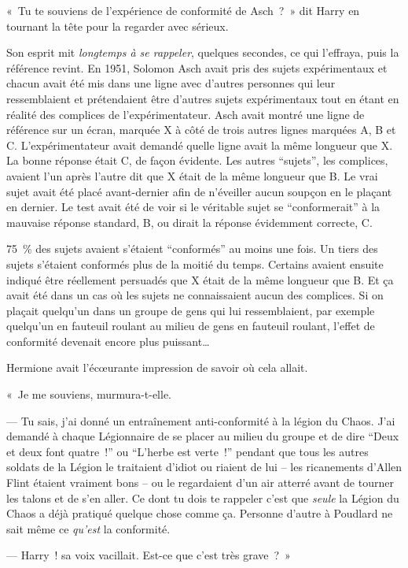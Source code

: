 «~Tu te souviens de l'expérience de conformité de Asch~?~»
dit Harry en tournant la tête pour la regarder avec sérieux.

Son esprit mit \emph{longtemps à se rappeler}, quelques secondes, ce qui l'effraya, puis la référence revint.
En 1951, Solomon Asch avait pris des sujets expérimentaux et chacun avait été mis dans une ligne avec d'autres personnes qui leur ressemblaient et prétendaient être d'autres sujets expérimentaux tout en étant en réalité des complices de l'expérimentateur.
Asch avait montré une ligne de référence sur un écran, marquée X à côté de trois autres lignes marquées A, B et C.
L'expérimentateur avait demandé quelle ligne avait la même longueur que X.
La bonne réponse était C, de façon évidente.
Les autres “sujets”, les complices, avaient l'un après l'autre dit que X était de la même longueur que B.
Le vrai sujet avait été placé avant-dernier afin de n'éveiller aucun soupçon en le plaçant en dernier.
Le test avait été de voir si le véritable sujet se “conformerait” à la mauvaise réponse standard, B, ou dirait la réponse évidemment correcte, C.

75~\% des sujets avaient s'étaient “conformés” au moins une fois.
Un tiers des sujets s'étaient conformés plus de la moitié du temps.
Certains avaient ensuite indiqué être réellement persuadés que X était de la même longueur que B.
Et ça avait été dans un cas où les sujets ne connaissaient aucun des complices.
Si on plaçait quelqu'un dans un groupe de gens qui lui ressemblaient, par exemple quelqu'un en fauteuil roulant au milieu de gens en fauteuil roulant, l'effet de conformité devenait encore plus puissant…

Hermione avait l'écœurante impression de savoir où cela allait.

«~Je me souviens, murmura-t-elle.

--- Tu sais, j'ai donné un entraînement anti-conformité à la légion du Chaos.
J'ai demandé à chaque Légionnaire de se placer au milieu du groupe et de dire “Deux et deux font quatre~!” ou “L'herbe est verte~!” pendant que tous les autres soldats de la Légion le traitaient d'idiot ou riaient de lui -- les ricanements d'Allen Flint étaient vraiment bons -- ou le regardaient d'un air atterré avant de tourner les talons et de s'en aller.
Ce dont tu dois te rappeler c'est que \emph{seule} la Légion du Chaos a déjà pratiqué quelque chose comme ça.
Personne d'autre à Poudlard ne sait même ce \emph{qu'est} la conformité.

--- Harry~! sa voix vacillait.
Est-ce que c'est très grave~?~»

